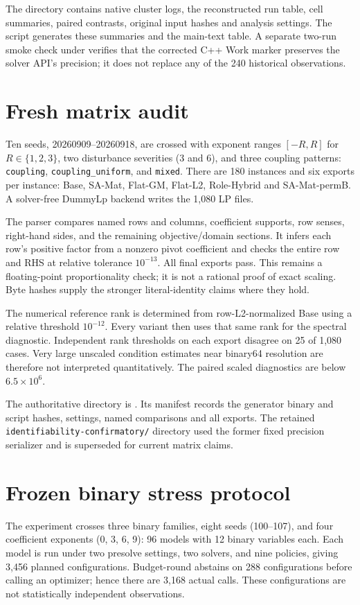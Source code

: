\documentclass[11pt]{article}
\begin{document}
The directory  contains native
cluster logs, the reconstructed run table, cell summaries, paired contrasts, original
input hashes and analysis settings. The script
 generates these summaries and the
main-text table. A separate two-run smoke check under 
verifies that the corrected C++ Work marker preserves the solver API's precision;
it does not replace any of the 240 historical observations.

\section{Fresh matrix audit}
Ten seeds, 20260909--20260918, are crossed with exponent ranges $[-R,R]$ for
$R\in\{1,2,3\}$, two disturbance severities (3 and 6), and three coupling patterns:
\texttt{coupling}, \texttt{coupling\_uniform}, and \texttt{mixed}. There are 180
instances and six exports per instance: Base, SA-Mat, Flat-GM, Flat-L2, Role-Hybrid
and SA-Mat-permB. A solver-free DummyLp backend writes the 1,080 LP files.

The parser compares named rows and columns, coefficient supports, row senses,
right-hand sides, and the remaining objective/domain sections. It infers each row's
positive factor from a nonzero pivot coefficient and checks the entire row and RHS
at relative tolerance $10^{-13}$. All final exports pass. This remains a
floating-point proportionality check; it is not a rational proof of exact scaling.
Byte hashes supply the stronger literal-identity claims where they hold.

The numerical reference rank is determined from row-L2-normalized Base using a
relative threshold $10^{-12}$. Every variant then uses that same rank for the
spectral diagnostic. Independent rank thresholds on each export disagree on 25 of
1,080 cases. Very large unscaled condition estimates near binary64 resolution are
therefore not interpreted quantitatively. The paired scaled diagnostics are below
$6.5\times10^6$.

The authoritative directory is
. Its manifest records
the generator binary and script hashes, settings, named comparisons and all exports.
The retained \texttt{identifiability-confirmatory/} directory used the former fixed
precision serializer and is superseded for current matrix claims.

\section{Frozen binary stress protocol}
The experiment crosses three binary families, eight seeds (100--107), and four
coefficient exponents (0, 3, 6, 9): 96 models with 12 binary variables each. Each
model is run under two presolve settings, two solvers, and nine policies, giving
3,456 planned configurations. Budget-round abstains on 288 configurations before
calling an optimizer; hence there are 3,168 actual calls. These configurations are
not statistically independent observations.
\end{document}
